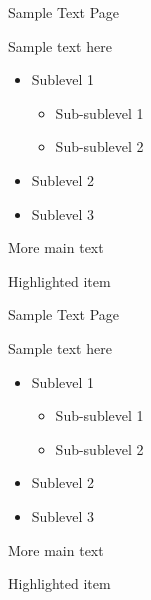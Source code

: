 \documentclass[aspectratio=169]{beamer}
\begin{document}
        \begin{frame}{Sample Text Page}
            \begin{vfilleditems}
                \item Sample text here
                \begin{itemize}
                    \item Sublevel 1
                    \begin{itemize}
                             	\item Sub-sublevel 1
                             	\item Sub-sublevel 2
                    \end{itemize}
                    \item Sublevel 2
                    \item Sublevel 3
                \end{itemize}
                \item More main text
                \item \alert{Highlighted item}
            \end{vfilleditems}
        \end{frame}
        
        \begin{frame}{Sample Text Page}
        	\begin{vfilleditems}
        		\item Sample text here
        		\begin{itemize}
        			\item Sublevel 1
        			\begin{itemize}
        				\item Sub-sublevel 1
        				\item Sub-sublevel 2
        			\end{itemize}
        			\item Sublevel 2
        			\item Sublevel 3
        		\end{itemize}
        		\item More main text
        		\item \alert{Highlighted item}
        	\end{vfilleditems}
        \end{frame}
        
\end{document}
